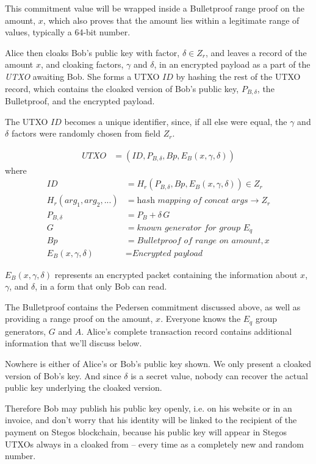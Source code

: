 \documentclass[a4paper, 10pt, conference]{ieeeconf}
\begin{document}
This commitment value will be wrapped inside a Bulletproof range proof on the amount, $x$, which also proves that the amount lies within a legitimate range of values, typically a 64-bit number.

Alice then cloaks Bob's public key with factor, $\delta \in Z_r$, and leaves a record of the amount $x$, and cloaking factors, $\gamma$ and $\delta$, in an encrypted payload as a part of the \textit{UTXO} awaiting Bob. She forms a UTXO $\mathit{ID}$ by hashing the rest of the UTXO record, which contains the cloaked version of Bob's public key, $P_{B, \delta}$, the Bulletproof, and the encrypted payload. 

The UTXO $\mathit{ID}$ becomes a unique identifier, since, if all else were equal, the $\gamma$ and $\delta$ factors were randomly chosen from field $Z_r$.

\begin{align*}
UTXO &= (ID, P_{B, \delta}, Bp, E_B(x, \gamma, \delta))
\end{align*}
where
\begin{align*}
ID &= H_r(P_{B, \delta}, Bp, E_B(x, \gamma, \delta)) \in Z_r \\
H_r(arg_1, arg_2, ...) &= \textit{hash mapping of concat args} \rightarrow Z_r \\
P_{B, \delta} &= P_B + \delta \, G \\
G &= \textit{known generator for group } E_q \\
Bp &= \textit{Bulletproof of range on amount}, x \\
E_B(x, \gamma, \delta) &= \textit{Encrypted payload}
\end{align*}

$E_B(x, \gamma, \delta)$ represents an encrypted packet containing the information about $x$, $\gamma$, and $\delta$, in a form that only Bob can read.

The Bulletproof contains the Pedersen commitment discussed above, as well as providing a range proof on the amount, $x$. Everyone knows the $E_q$ group generators, $G$ and $A$. Alice's complete transaction record contains additional information that we'll discuss below.

Nowhere is either of Alice's or Bob's public key shown. We only present a cloaked version of Bob's key. And since $\delta$ is a secret value, nobody can recover the actual public key underlying the cloaked version. 

Therefore Bob may publish his public key openly, i.e. on his website or in an  invoice, and don't worry that his identity will be linked to the recipient of the payment on Stegos blockchain, because his public key will appear in Stegos UTXOs always in a cloaked from -- every time as a completely new and random number.
\end{document}
